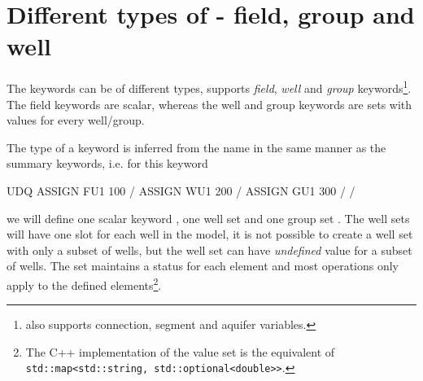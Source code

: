 \section{Different types of \udq{} - field, group and well}
The \udq{} keywords can be of different types, \flow{} supports \emph{field},
\emph{well} and \emph{group} keywords\footnote{\eclipse{} also supports
connection, segment and aquifer variables.}. The field keywords are scalar,
whereas the well and group keywords are sets with values for every well/group.

The type of a \udq{} keyword is inferred from the name in the same manner as the
summary keywords, i.e. for this \udq{} keyword
\begin{deck}
UDQ
  ASSIGN FU1 100 /
  ASSIGN WU1 200 /
  ASSIGN GU1 300 /
/
\end{deck}
we will define one scalar keyword , one well set  and one group
set . The well sets will have one slot for each well in the model, it is
not possible to create a well set with only a subset of wells, but the well set
can have \emph{undefined} value for a subset of wells. The set maintains a
 status for each element and most operations only
apply to the defined elements\footnote{The C++ implementation of the \udq{}
value set is the equivalent of \texttt{std::map<std::string,
  std::optional<double>>}.}.

